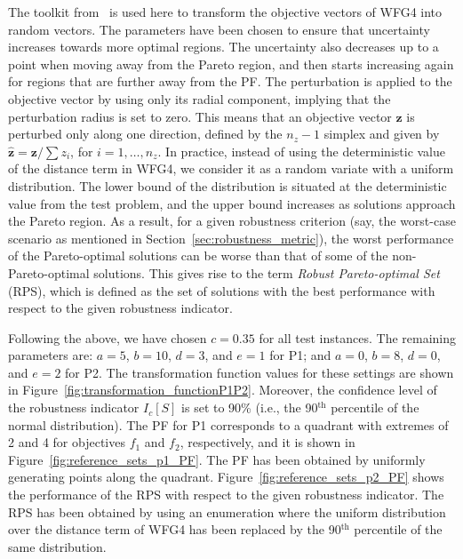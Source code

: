 \documentclass{llncs}
\newcommand{\vz}{\mathbf{z}} %
\begin{document}
The toolkit from~\cite{Salomon2016Toolkit} is used here to transform the objective vectors of WFG4 into random vectors. The parameters have been chosen to ensure that uncertainty increases towards more optimal regions. The uncertainty also decreases up to a point when moving away from the Pareto region, and then starts increasing again for regions that are further away from the PF. The perturbation is applied to the objective vector by using only its radial component, implying that the perturbation radius is set to zero. This means that an objective vector $\vz$ is perturbed only along one direction, defined by the $n_z-1$ simplex and given by $\hat{\vz} = \vz/\sum z_i$, for $i=1,\ldots,n_z$. In practice, instead of using the deterministic value of the distance term in WFG4, we consider it as a random variate with a uniform distribution. The lower bound of the distribution is situated at the deterministic value from the test problem, and the upper bound increases as solutions approach the Pareto region. As a result, for a given robustness criterion (say, the worst-case scenario as mentioned in Section~\ref{sec:robustness_metric}), the worst performance of the Pareto-optimal solutions can be worse than that of some of the non-Pareto-optimal solutions. This gives rise to the term \textit{Robust Pareto-optimal Set} (RPS), which is defined as the set of solutions with the best performance with respect to the given robustness indicator.

Following the above, we have chosen $c=0.35$ for all test instances. The remaining parameters are: $a=5$, $b=10$, $d=3$, and $e=1$ for P1; and $a=0$, $b=8$, $d=0$, and $e=2$ for P2. The transformation function values for these settings are shown in Figure~\ref{fig:transformation_functionP1P2}. Moreover, the confidence level of the robustness indicator $I_c[S]$ is set to 90\% (i.e., the 90$^\textrm{th}$ percentile of the normal distribution). The PF for P1 corresponds to a quadrant with extremes of 2 and 4 for objectives $f_1$ and $f_2$, respectively, and it is shown in Figure~\ref{fig:reference_sets_p1_PF}. The PF has been obtained by uniformly generating points along the quadrant. Figure~\ref{fig:reference_sets_p2_PF} shows the performance of the RPS with respect to the given robustness indicator. The RPS has been obtained by using an enumeration where the uniform distribution over the distance term of WFG4 has been replaced by the 90$^\textrm{th}$ percentile of the same distribution.
\end{document}
